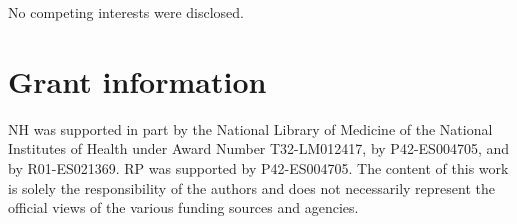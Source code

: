 \documentclass[9pt,a4paper,]{extarticle}
\theoremstyle{definition}
\theoremstyle{definition}
\theoremstyle{definition}
\theoremstyle{remark}
\begin{document}
No competing interests were disclosed.

\hypertarget{grant-information}{%
\section{Grant information}\label{grant-information}}

NH was supported in part by the National Library of Medicine of the National
Institutes of Health under Award Number T32-LM012417, by P42-ES004705, and
by R01-ES021369. RP was supported by P42-ES004705. The content of this work is
solely the responsibility of the authors and does not necessarily represent the
official views of the various funding sources and agencies.

\renewcommand\refname{References}
{\small}
\end{document}
